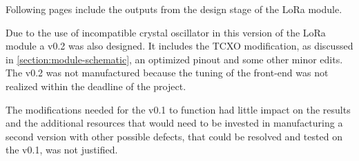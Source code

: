 
Following pages include the outputs from the design stage of the LoRa module.

Due to the use of incompatible crystal oscillator in this version of the LoRa module a v0.2 was also designed. It includes the TCXO modification, as discussed in \ref{section:module-schematic}, an optimized pinout and some other minor edits. The v0.2 was not manufactured because the tuning of the front-end was not realized within the deadline of the project. 

The modifications needed for the v0.1 to function had little impact on the results and the additional resources that would need to be invested in manufacturing a second version with other possible defects, that could be resolved and tested on the v0.1, was not justified.


